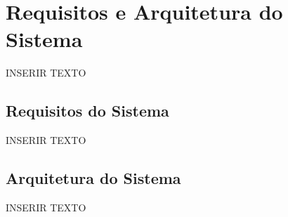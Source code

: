 \chapter{Requisitos e Arquitetura do Sistema}
\label{chp:requirements}

INSERIR TEXTO

\section{Requisitos do Sistema}
INSERIR TEXTO

\section{Arquitetura do Sistema}
INSERIR TEXTO